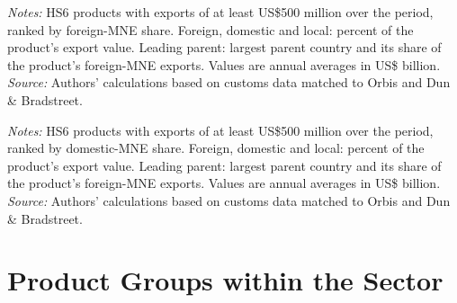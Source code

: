 \documentclass[11pt,a4paper]{article}
\begin{document}
\begin{table}[H]\centering\footnotesize%
  \caption{Manufacturing: Products with the Highest Foreign-Multinational Share}%
  \label{tab:hs_by_foreign_share_manufacturing}%
  \par\vspace{3pt}%
  \begin{minipage}{0.95\textwidth}\footnotesize %
  \textit{Notes:} HS6 products with exports of at least US\$500 million over the period, ranked by foreign-MNE share. Foreign, domestic and local: percent of the product's export value. Leading parent: largest parent country and its share of the product's foreign-MNE exports. Values are annual averages in US\$ billion.\\[3pt]%
  \textit{Source:} Authors' calculations based on customs data matched to Orbis and Dun \& Bradstreet.%
  \end{minipage}%
  \end{table}
\begin{table}[H]\centering\footnotesize%
  \caption{Manufacturing: Products with the Highest Domestic-Multinational Share}%
  \label{tab:hs_by_domestic_share_manufacturing}%
  \par\vspace{3pt}%
  \begin{minipage}{0.95\textwidth}\footnotesize %
  \textit{Notes:} HS6 products with exports of at least US\$500 million over the period, ranked by domestic-MNE share. Foreign, domestic and local: percent of the product's export value. Leading parent: largest parent country and its share of the product's foreign-MNE exports. Values are annual averages in US\$ billion.\\[3pt]%
  \textit{Source:} Authors' calculations based on customs data matched to Orbis and Dun \& Bradstreet.%
  \end{minipage}%
  \end{table}

\section{Product Groups within the Sector}\label{sec:sub_manufacturing}
\end{document}
